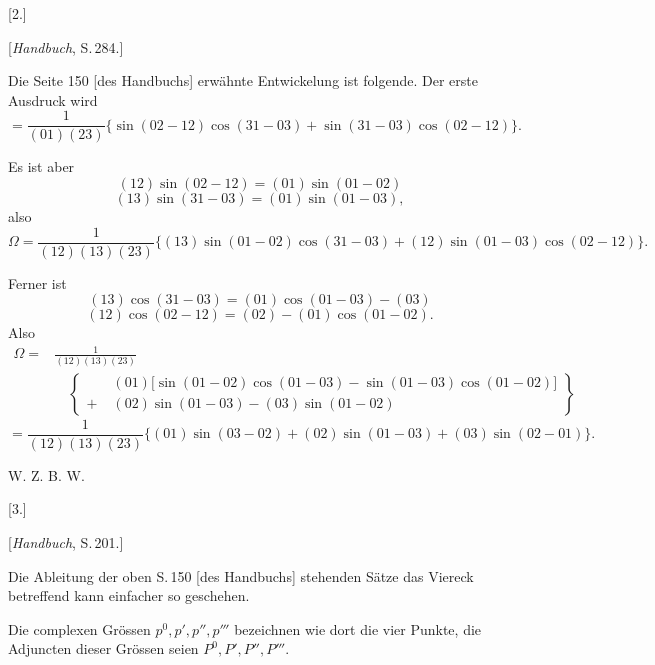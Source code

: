 
\begin{center}
[2.]

[\emph{Handbuch}, S.\,284.]
\end{center}

Die Seite 150 [des Handbuchs] erwähnte Entwickelung ist folgende. Der erste Ausdruck wird
\[
= \frac{1}{(01)(23)}\{\sin(02-12)\cos(31-03)+\sin(31-03)\cos(02-12)\}.
\]

Es ist aber
\[
(12)\sin(02-12) = (01)\sin(01-02)
\]
\[
(13)\sin(31-03) = (01)\sin(01-03),
\]
also
\[
\Omega = \frac{1}{(12)(13)(23)}\{(13)\sin(01-02)\cos(31-03)+(12)\sin(01-03)\cos(02-12)\}.
\]

Ferner ist
\[
(13)\cos(31-03) = (01)\cos(01-03)-(03)
\]
\[
(12)\cos(02-12) = (02)-(01)\cos(01-02).
\]
Also
\[
\begin{aligned}
\Omega ={}& \frac{1}{(12)(13)(23)}\\
&\quad\left\{
\begin{aligned}
&(01)\big[\sin(01-02)\cos(01-03)-\sin(01-03)\cos(01-02)\big]\\
+\;&(02)\sin(01-03)-(03)\sin(01-02)
\end{aligned}
\right\}
\end{aligned}
\]
\[
= \frac{1}{(12)(13)(23)}\{(01)\sin(03-02)+(02)\sin(01-03)+(03)\sin(02-01)\}.
\]

\begin{center}
W. Z. B. W.

[3.]

[\emph{Handbuch}, S.\,201.]
\end{center}

Die Ableitung der oben S.\,150 [des Handbuchs] stehenden Sätze das Viereck betreffend kann einfacher so geschehen.

Die complexen Grössen $p^0, p', p'', p'''$ bezeichnen wie dort die vier Punkte, die Adjuncten dieser Grössen seien $P^0, P', P'', P'''$.
